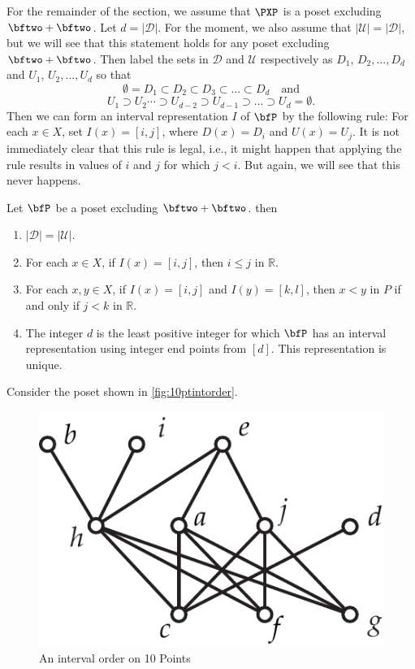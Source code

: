 For the remainder of the section, we assume that $\PXP$ is a poset
excluding $\bftwo+\bftwo$.  Let $d=|\mathcal{D}|$.  For the moment,
we also assume that $|\mathcal{U}|=|\mathcal{D}|$, but we will see that this
statement holds for any poset excluding $\bftwo+\bftwo$.
Then label the sets in $\mathcal{D}$ and $\mathcal{U}$ respectively as
$D_1$, $D_2,\dots,D_d$ and $U_1$, $U_2,\dots,U_d$ 
so that
\[
\emptyset= D_1\subset D_2\subset D_3\subset\dots\subset D_d
 \quad\text{and}
\]
\[
U_1\supset U_{2}\cdots \supset U_{d-2}\supset U_{d-1}\supset\dots\supset U_d
 =\emptyset.
\]
Then we can form an interval representation $I$ of $\bfP$ by the
following rule:  For each $x\in X$, set $I(x)=[i,j]$, where
$D(x)=D_i$ and $U(x)=U_j$.  It is not immediately clear that this
rule is legal, i.e., it might happen that applying the rule results
in values of $i$ and $j$ for which $j<i$.  But again, we will see
that this never happens.

\begin{proposition}\label{prop:intord-minrep}
Let $\bfP$ be a poset excluding $\bftwo+\bftwo$.
then 
\begin{enumerate}
\item $|\mathcal{D}|=|\mathcal{U}|$.
\item For each $x\in X$, if $I(x)=[i,j]$, then $i\le j$ in $\mathbb{R}$.
\item For each $x,y\in X$, if $I(x)=[i,j]$ and $I(y)=[k,l]$, then
$x<y$ in $P$ if and only if $j<k$ in $\mathbb{R}$.
\item The integer $d$ is the least positive integer for which
$\bfP$ has an interval representation using integer end points
from $[d]$.  This representation is unique.
\end{enumerate}
\end{proposition}

Consider the poset shown in \autoref{fig:10ptintorder}.

\begin{figure}
\begin{center}
\includegraphics*[scale=.4]{posets-figs/10ptintorder.pdf}
\caption{An interval order on 10 Points}
\label{fig:10ptintorder} 
\end{center}
\end{figure}

